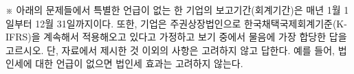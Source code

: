 \begin{framedtext}
※ 아래의 문제들에서 특별한 언급이 없는 한 기업의 보고기간(회계기간)은 매년 1월 1일부터 12월 31일까지이다. 또한, 기업은 주권상장법인으로 한국채택국제회계기준(K-IFRS)을 계속해서 적용해오고 있다고 가정하고 보기 중에서 물음에 가장 합당한 답을 고르시오. 단, 자료에서 제시한 것 이외의 사항은 고려하지 않고 답한다. 예를 들어, 법인세에 대한 언급이 없으면 법인세 효과는 고려하지 않는다. \par
\end{framedtext}
